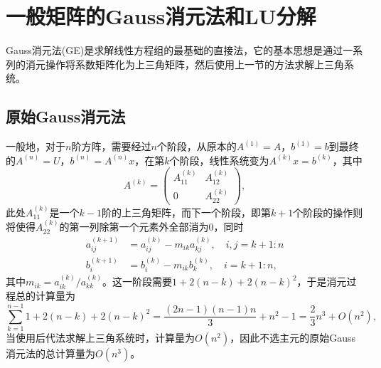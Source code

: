 \documentclass[a4paper,10pt]{ctexart}
\begin{document}
\section{一般矩阵的Gauss消元法和LU分解}
Gauss消元法(GE)是求解线性方程组的最基础的直接法，它的基本思想是通过一系列的消元操作将系数矩阵化为上三角矩阵，然后使用上一节的方法求解上三角系统。
\subsection{原始Gauss消元法}
一般地，对于$ n $阶方阵，需要经过$ n $个阶段，从原本的$ A^{(1)} = A $，$ b^{(1)} = b $到最终的$ A^{(n)} = U $，$ b^{(n)} = A^{(n)}x $，在第$ k $个阶段，线性系统变为$ A^{(k)}x = b^{(k)} $，其中
\[
    A^{(k)} = 
    \begin{pmatrix}
        A^{(k)}_{11} & A^{(k)}_{12} \\
        0 & A^{(k)}_{22}
    \end{pmatrix},
\]
此处$ A^{(k)}_{11} $是一个$ k-1 $阶的上三角矩阵，而下一个阶段，即第$ k+1 $个阶段的操作则将使得$ A^{(k)}_{22} $的第一列除第一个元素外全部消为0，同时
\[
    \begin{aligned}
        a_{ij}^{(k+1)} &= a_{ij}^{(k)} - m_{ik} a_{kj}^{(k)},\quad i,j = k+1:n\\
        b_i^{(k+1)} &= b_i^{(k)} - m_{ik} b_k^{(k)},\quad i = k+1:n,
    \end{aligned}
\]
其中$ m_{ik} = a^{(k)}_{ik} / a^{(k)}_{kk} $。这一阶段需要$ 1+2(n-k)+2(n-k)^2 $，于是消元过程总的计算量为
\[
    \sum_{k=1}^{n-1} 1+2(n-k)+2(n-k)^2 = \frac{(2n-1)(n-1)n}{3}+n^2-1 = \frac{2}{3}n^3 + O(n^2),
\]
当使用后代法求解上三角系统时，计算量为$ O(n^2) $，因此不选主元的原始Gauss消元法的总计算量为$ O(n^3) $。
\end{document}
